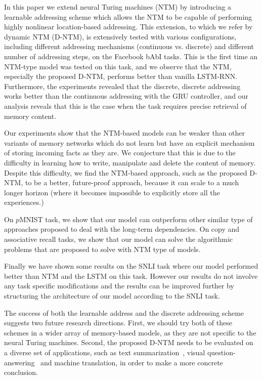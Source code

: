 \documentclass[12pt]{article}
\begin{document}
In this paper we extend neural Turing machines (NTM) by introducing a learnable addressing scheme which allows the NTM to be capable of performing highly nonlinear location-based addressing. This extension, to which we refer by dynamic NTM (D-NTM), is extensively tested with various configurations, including different addressing mechanisms (continuous vs. discrete) and different number of addressing steps, on the Facebook bAbI tasks. This is the first time an NTM-type model was tested on this task, and we observe that the NTM, especially the proposed D-NTM, performs better than vanilla LSTM-RNN. Furthermore, the experiments revealed that the discrete, discrete addressing works better than the continuous addressing with the GRU controller, and our analysis reveals that this is the case when the task requires precise retrieval of memory content. 

Our experiments show that the NTM-based models can be weaker than other variants of memory networks which do not learn but have an explicit mechanism of storing incoming facts as they are. We conjecture that this is due to the difficulty in learning how to write, manipulate and delete the content of memory. Despite this difficulty, we find the NTM-based approach, such as the proposed D-NTM, to be a better, future-proof approach, because it can scale to a much longer horizon (where it becomes impossible to explicitly store all the experiences.)

On $p$MNIST task, we show that our model can outperform other similar type of approaches proposed to deal with the long-term dependencies. On copy and associative recall tasks, we show that our model can solve the algorithmic problems that are proposed to solve with NTM type of models.

Finally we have shown some results on the SNLI task where our model performed better than NTM and the LSTM on this task. However our results do not involve any task specific modifications and the results can be improved further by structuring the architecture of our model according to the SNLI task.

The success of both the learnable address and the discrete addressing scheme suggests two future research directions. First, we should try both of these schemes in a wider array of memory-based models, as they are not specific to the neural Turing machines. Second, the proposed D-NTM needs to be evaluated on a diverse set of applications, such as text summarization~\citep{para}, visual question-answering~\citep{vqa} and machine translation, in order to make a more concrete conclusion.



\end{document}
